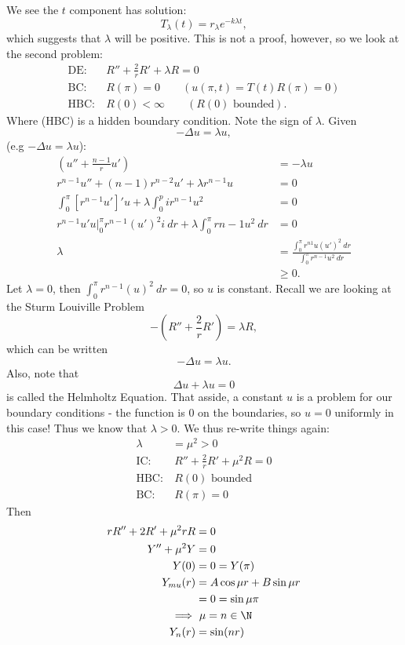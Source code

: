 \documentclass[cm]{article}
\begin{document}
We see the $t$ component has solution:
$$T_\lambda(t) = r_\lambda e^{-k \lambda t},$$
which suggests that $\lambda$ will be positive. This is not a proof, however, so
we look at the second problem:
\begin{align*}
\text{DE:}&~ R'' + \frac{2}{r} R' + \lambda R = 0 \\
\text{BC:}&~ R(\pi) = 0 \qquad ( u(\pi, t) = T(t) R(\pi) = 0 ) \\
\text{HBC:}&~ R(0) < \infty \qquad (R(0) \text{ bounded} ).
\end{align*}
Where (HBC) is a hidden boundary condition. Note the sign of $\lambda$. Given
$$-\Delta u = \lambda u,$$
(e.g $-\Delta u = \lambda u$):
\begin{align*}
(u'' + \frac{n-1}{r} u') &= - \lambda u \\
r^{n-1} u'' + (n-1) r^{n-2} u' + \lambda r^{n-1} u &= 0 \\
\int_0^\pi[r^{n-1} u']'u + \lambda \int_0^pi r^{n-1} u^2 &= 0 \\
r^{n-1}u'u\Big|_0^\pi r^{n-1}(u')^2i~dr + \lambda \int_0^\pi r{n-1} u^2~dr &= 0\\
\lambda &= \frac{\int_0^\pi r^{n1} u(u')^2~dr}{\int_0^\pi r^{n-1} u^2~dr} \\
&\geq 0. 
\end{align*}
Let $\lambda = 0$, then $\int_0^\pi r^{n-1} (u)^2 ~dr = 0$, so $u$ is constant.
Recall we are looking at the Sturm Louiville Problem
$$-(R'' + \frac{2}{r} R') = \lambda R,$$
which can be written
$$-\Delta u = \lambda u.$$ Also, note that
$$ \Delta u + \lambda u = 0$$ is called the Helmholtz Equation. That asside,
a constant $u$ is a problem for our boundary conditions - the function is $0$ on
the boundaries, so $u = 0$ uniformly in this case! Thus we know that $\lambda >
0$. We thus re-write things again:
\begin{align*}
\lambda &= \mu^2 > 0 \\
\text{IC:}&~ R'' + \frac{2}{r} R' + \mu^2 R = 0 \\
\text{HBC:}&~ R(0) \text{ bounded} \\
\text{BC:}&~ R(\pi) = 0
\end{align*}
Then
\begin{align*}
rR'' + 2R' + \mu^2 rR &= 0 \\
Y'' + \mu^2 Y &= 0 \\
Y(0) & = 0 = Y(\pi) \\
Y_{mu}(r) &= A \cos \mu r + B \sin \mu r \\
        &= 0 = \sin \mu \pi \\
        \implies&~ \mu = n \in \N \\
Y_n(r) &= \sin(nr)
\end{align*}
\end{document}
